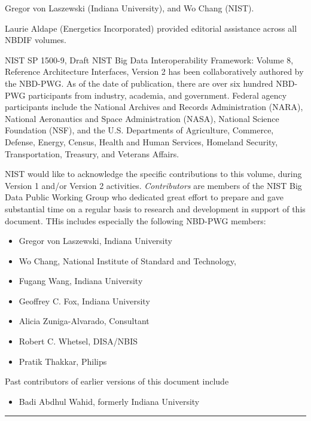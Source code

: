\documentclass[9pt,]{article}
\providecommand{\tightlist}{%
  \setlength{\itemsep}{0pt}\setlength{\parskip}{0pt}}
\begin{document}
Gregor von Laszewski (Indiana University), and Wo Chang (NIST).

Laurie Aldape (Energetics Incorporated) provided editorial assistance
across all NBDIF volumes.

NIST SP 1500-9, Draft NIST Big Data Interoperability Framework: Volume
8, Reference Architecture Interfaces, Version 2 has been collaboratively
authored by the NBD-PWG. As of the date of publication, there are over
six hundred NBD-PWG participants from industry, academia, and
government. Federal agency participants include the National Archives
and Records Administration (NARA), National Aeronautics and Space
Administration (NASA), National Science Foundation (NSF), and the U.S.
Departments of Agriculture, Commerce, Defense, Energy, Census, Health
and Human Services, Homeland Security, Transportation, Treasury, and
Veterans Affairs.

NIST would like to acknowledge the specific contributions to this
volume, during Version 1 and/or Version 2 activities.
\emph{Contributors} are members of the NIST Big Data Public Working
Group who dedicated great effort to prepare and gave substantial time on
a regular basis to research and development in support of this document.
THis includes especially the following NBD-PWG members:

\begin{itemize}
\tightlist
\item
  Gregor von\textbar{} Laszewski, Indiana University
\item
  Wo Chang, National Institute of Standard and Technology,
\item
  Fugang Wang, Indiana University
\item
  Geoffrey C. Fox, Indiana University
\item
  Alicia Zuniga-Alvarado, Consultant
\item
  Robert C. Whetsel, DISA/NBIS
\item
  Pratik Thakkar, Philips
\end{itemize}

Past contributors of earlier versions of this document include

\begin{itemize}
\tightlist
\item
  Badi Abdhul Wahid, formerly Indiana University
\end{itemize}

\begin{center}\rule{0.5\linewidth}{\linethickness}\end{center}
\end{document}
